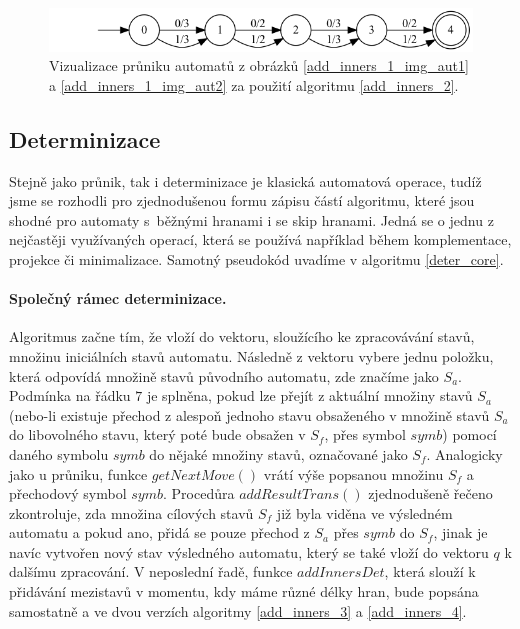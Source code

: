 \begin{figure}
    \centering
    \includegraphics[scale=0.37]{obrazky-figures/add_inners_2_img_aut1.png}
    \caption{Vizualizace průniku automatů z obrázků \ref{add_inners_1_img_aut1} a \ref{add_inners_1_img_aut2} za použití algoritmu \ref{add_inners_2}.}
    \label{add_inners_2_img}
\end{figure}

\subsection{Determinizace}

Stejně jako průnik, tak i determinizace je klasická automatová operace, tudíž jsme se rozhodli pro zjednodušenou formu zápisu částí algoritmu, které jsou shodné pro automaty s~běžnými hranami i se skip hranami. Jedná se o jednu z nejčastěji využívaných operací, která se používá například během komplementace, projekce či minimalizace. Samotný pseudokód uvadíme v algoritmu \ref{deter_core}.

\paragraph{Společný rámec determinizace.} Algoritmus začne tím, že vloží do vektoru, sloužícího ke zpracovávání stavů, množinu iniciálních stavů automatu. Následně z vektoru vybere jednu položku, která odpovídá množině stavů původního automatu, zde značíme jako $S_a$. Podmínka na řádku $7$ je splněna, pokud lze přejít z aktuální množiny stavů $S_a$ (nebo-li existuje přechod z alespoň jednoho stavu obsaženého v množině stavů $S_a$ do libovolného stavu, který poté bude obsažen v $S_f$, přes symbol $symb$) pomocí daného symbolu $symb$ do nějaké množiny stavů, označované jako $S_f$. Analogicky jako u průniku, funkce $getNextMove()$ vrátí výše popsanou množinu $S_f$ a přechodový symbol $symb$. Procedůra $addResultTrans()$ zjednodušeně řečeno zkontroluje, zda množina cílových stavů $S_f$ již byla viděna ve výsledném automatu a pokud ano, přidá se pouze přechod z $S_a$ přes $symb$ do $S_f$, jinak je navíc vytvořen nový stav výsledného automatu, který se také vloží do vektoru $q$ k dalšímu zpracování. V neposlední řadě, funkce $addInnersDet$, která slouží k přidávání mezistavů v momentu, kdy máme různé délky hran, bude popsána samostatně a ve dvou verzích algoritmy \ref{add_inners_3} a \ref{add_inners_4}.

